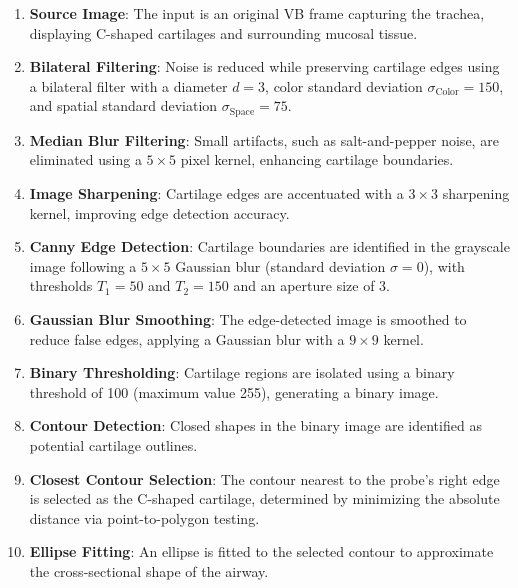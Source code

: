 \begin{enumerate}
    \item \textbf{Source Image}: The input is an original VB frame capturing the trachea, displaying C-shaped cartilages and surrounding mucosal tissue.
    \item \textbf{Bilateral Filtering}: Noise is reduced while preserving cartilage edges using a bilateral filter with a diameter $d=3$, color standard deviation $\sigma_{\text{Color}} = 150$, and spatial standard deviation $\sigma_{\text{Space}} = 75$.
    \item \textbf{Median Blur Filtering}: Small artifacts, such as salt-and-pepper noise, are eliminated using a $5 \times 5$ pixel kernel, enhancing cartilage boundaries.
    \item \textbf{Image Sharpening}: Cartilage edges are accentuated with a $3 \times 3$ sharpening kernel, improving edge detection accuracy.
    \item \textbf{Canny Edge Detection}: Cartilage boundaries are identified in the grayscale image following a $5 \times 5$ Gaussian blur (standard deviation $\sigma = 0$), with thresholds $T_1 = 50$ and $T_2 = 150$ and an aperture size of 3.
    \item \textbf{Gaussian Blur Smoothing}: The edge-detected image is smoothed to reduce false edges, applying a Gaussian blur with a $9 \times 9$ kernel.
    \item \textbf{Binary Thresholding}: Cartilage regions are isolated using a binary threshold of 100 (maximum value 255), generating a binary image.
    \item \textbf{Contour Detection}: Closed shapes in the binary image are identified as potential cartilage outlines.
    \item \textbf{Closest Contour Selection}: The contour nearest to the probe’s right edge is selected as the C-shaped cartilage, determined by minimizing the absolute distance via point-to-polygon testing.
    \item \textbf{Ellipse Fitting}: An ellipse is fitted to the selected contour to approximate the cross-sectional shape of the airway.
\end{enumerate}

